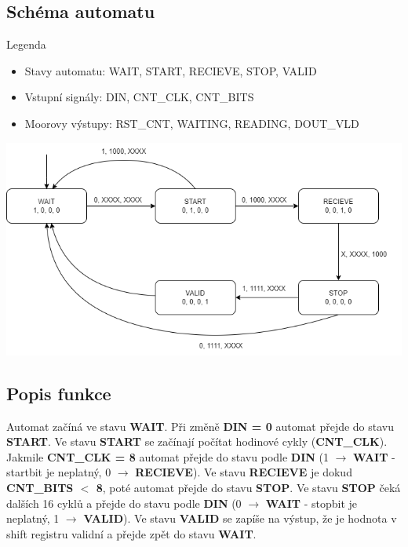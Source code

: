 \documentclass[11pt,a4paper,oneside]{article}
\begin{document}
\subsection*{Schéma automatu}
Legenda
\begin{itemize}
  \item Stavy automatu: WAIT, START, RECIEVE, STOP, VALID
  \item Vstupní signály: DIN, CNT\_CLK, CNT\_BITS
  \item Moorovy výstupy: RST\_CNT, WAITING, READING, DOUT\_VLD
\end{itemize}
\includegraphics[width=\textwidth,height=\textheight,keepaspectratio]{fsm}
\subsection*{Popis funkce}
Automat začíná ve stavu \textbf{WAIT}. Při změně \textbf{DIN = 0} automat přejde do stavu \textbf{START}.
Ve stavu \textbf{START} se začínají počítat hodinové cykly (\textbf{CNT\_CLK}).
Jakmile \textbf{CNT\_CLK = 8} automat přejde do stavu podle \textbf{DIN}
(1 $\rightarrow$ \textbf{WAIT} - startbit je neplatný, 0 $\rightarrow$ \textbf{RECIEVE}).
Ve stavu \textbf{RECIEVE} je dokud \textbf{CNT\_BITS $<$ 8}, poté automat přejde do stavu \textbf{STOP}.
Ve stavu \textbf{STOP} čeká dalších 16 cyklů a přejde do stavu podle \textbf{DIN} (0 $\rightarrow$ \textbf{WAIT} - stopbit je neplatný, 1 $\rightarrow$ \textbf{VALID}).
Ve stavu \textbf{VALID} se zapíše na výstup, že je hodnota v shift registru validní a přejde zpět do stavu \textbf{WAIT}.
\end{document}
